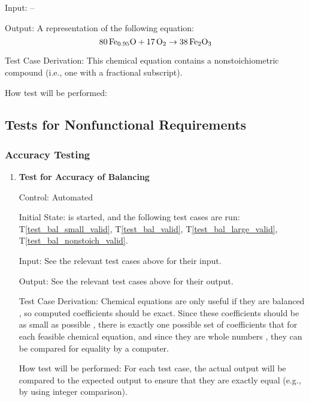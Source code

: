 \documentclass[12pt, titlepage]{article}
\newcounter{testnum} %
\newcommand{\testref}[1]{T\ref{#1}}
\begin{document}
\begin{enumerate}
    Input: --

    Output: A representation of the following equation:
    $$\ce{80Fe_{0.95}O} + \ce{17O2} \rightarrow \ce{38Fe2O3}$$

    Test Case Derivation: This chemical equation
    contains a nonstoichiometric compound (i.e., one with a fractional
    subscript).

    How test will be performed: 

\end{enumerate}

\subsection{Tests for Nonfunctional Requirements}

\subsubsection{Accuracy Testing}

\begin{enumerate}

  \item[T\refstepcounter{testnum}\thetestnum \label{test_bal_accuracy}:]
    \textbf{Test for Accuracy of Balancing}

    Control: Automated

    Initial State: \progname{} is started, and the following test cases are
    run: \testref{test_bal_small_valid}, \testref{test_bal_valid},
    \testref{test_bal_large_valid}, \testref{test_bal_nonstoich_valid}.

    Input: See the relevant test cases above for their input.

    Output: See the relevant test cases above for their output.

    Test Case Derivation: Chemical equations are only useful if they are
    balanced \cite{lund_introduction_2023}, so computed coefficients should be
    exact. Since these coefficients should be as small as possible
    \cite{lund_introduction_2023}, there is exactly one possible set of
    coefficients that for each feasible chemical equation, and since they are
    whole numbers \cite{lund_introduction_2023}, they can be compared for
    equality by a computer.

    How test will be performed: For each test case, the actual output will be
    compared to the expected output to ensure that they are exactly equal
    (e.g., by using integer comparison).

\end{enumerate}
\end{document}
